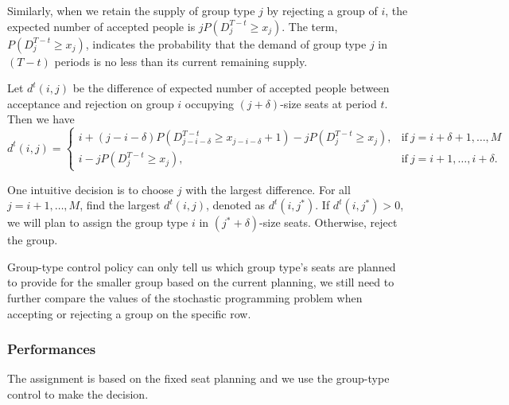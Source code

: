 Similarly, when we retain the supply of group type $j$ by rejecting a group of $i$, the expected number of accepted people is $j P(D_{j}^{T-t} \geq x_{j})$. The term, $P(D_{j}^{T-t} \geq x_{j})$, indicates the probability that the demand of group type $j$ in $(T-t)$ periods is no less than its current remaining supply.

Let $d^{t}(i,j)$ be the difference of expected number of accepted people between acceptance and rejection on group $i$ occupying $(j+\delta)$-size seats at period $t$. Then we have
\begin{equation*}
	d^{t}(i,j) = \begin{cases}
    i + (j-i-\delta)P(D_{j-i-\delta}^{T-t} \geq x_{j-i-\delta}+1) - j P(D_{j}^{T-t} \geq x_{j}), &\text{if}~ j = i+\delta+1, \ldots, M \\
    i - j P(D_{j}^{T-t} \geq x_{j}), &\text{if}~ j = i+1, \ldots, i+\delta.
		\end{cases}
\end{equation*}

One intuitive decision is to choose $j$ with the largest difference. For all $j = i+1, \ldots, M$, find the largest $d^{t}(i,j)$, denoted as $d^{t}(i,j^{*})$. If $d^{t}(i,j^{*}) >0$, we will plan to assign the group type $i$ in $(j^{*}+\delta)$-size seats. Otherwise, reject the group.

Group-type control policy can only tell us which group type's seats are planned to provide for the smaller group based on the current planning, we still need to further compare the values of the stochastic programming problem when accepting or rejecting a group on the specific row. 


\subsubsection{Performances}
The assignment is based on the fixed seat planning and we use the group-type control to make the
decision.

